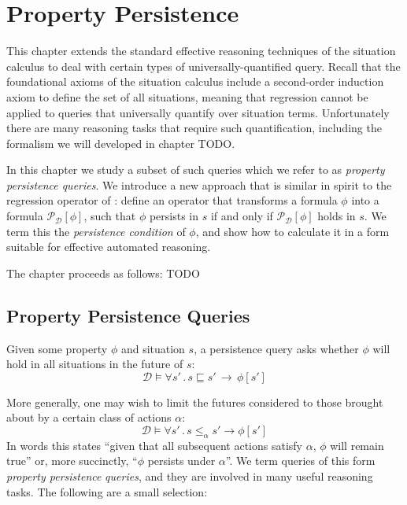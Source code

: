 

\chapter{Property Persistence}

\label{ch:persistence}

This chapter extends the standard effective reasoning techniques of
the situation calculus to deal with certain types of universally-quantified
query. Recall that the foundational axioms of the situation calculus
include a second-order induction axiom to define the set of all situations,
meaning that regression cannot be applied to queries that universally
quantify over situation terms. Unfortunately there are many reasoning
tasks that require such quantification, including the formalism we
will developed in chapter TODO.

In this chapter we study a subset of such queries which we refer to
as \emph{property persistence queries}. We introduce a new approach
that is similar in spirit to the regression operator of \citep{reiter91frameprob}:
define an operator that transforms a formula $\phi$ into a formula
$\mathcal{P}_{\mathcal{D}}[\phi]$, such that $\phi$ persists in
$s$ if and only if $\mathcal{P}_{\mathcal{D}}[\phi]$ holds in $s$.
We term this the \emph{persistence condition} of $\phi$, and show
how to calculate it in a form suitable for effective automated reasoning.

The chapter proceeds as follows: TODO


\section{Property Persistence Queries}

Given some property $\phi$ and situation $s$, a persistence query
asks whether $\phi$ will hold in all situations in the future of
$s$:\[
\mathcal{D}\models\forall s'\,.\, s\sqsubseteq s'\,\rightarrow\,\phi[s']\]


More generally, one may wish to limit the futures considered to those
brought about by a certain class of actions $\alpha$:\[
\mathcal{D}\models\forall s'\,.\, s\le_{\alpha}s'\rightarrow\phi[s']\]
 In words this states {}``given that all subsequent actions satisfy
$\alpha$, $\phi$ will remain true'' or, more succinctly, {}``$\phi$
persists under $\alpha$''. We term queries of this form \emph{property
persistence} \emph{queries}, and they are involved in many useful
reasoning tasks. The following are a small selection:

